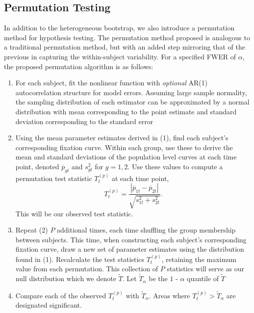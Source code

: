 \documentclass{article}
\begin{document}
\subsection{Permutation Testing}

In addition to the heterogeneous bootstrap, we also introduce a permutation method for hypothesis testing. The permutation method proposed is analogous to a traditional permutation method, but with an added step mirroring that of the previous in capturing the within-subject variability. For a specified FWER of $\alpha$, the proposed permutation algorithm is as follows:

\begin{enumerate}
\vspace{-2mm}
\item For each subject, fit the nonlinear function with \textit{optional} AR(1) autocorrelation structure for model errors. Assuming large sample normality, the sampling distribution of each estimator can be approximated by a normal distribution with mean corresponding to the point estimate and standard deviation corresponding to the standard error
\item Using the mean parameter estimates derived in (1), find each subject's corresponding fixation curve. Within each group, use these to derive the mean and standard deviations of the population level curves at each time point, denoted $\overline{p}_{gt}$ and $s_{gt}^2$ for $g = 1,2$. Use these values to compute a permutation test statistic $T_t^{(p)}$ at each time point,
\begin{equation}
T_t^{(p)} = \frac{|\overline{p}_{1t} - \overline{p}_{2t}|}{\sqrt{s_{1t}^2 + s_{2t}^2}}.
\end{equation}
This will be our observed test statistic.
\item Repeat (2) $P$  additional times, each time shuffling the group membership between subjects. This time, when constructing each subject's corresponding fixation curve, draw a new set of parameter estimates using the distribution found in (1). Recalculate the test statistics $T_t^{(p)}$, retaining the maximum value from each permutation. This collection of $P$ statistics will serve as our null distribution which we denote $\widetilde{T}$. Let $\widetilde{T}_{\alpha}$ be the $1$ - $\alpha$ quantile of $\widetilde{T}$
\item Compare each of the observed $T_t^{(p)}$ with $\widetilde{T}_{\alpha}$. Areas where $T_t^{(p)} > \widetilde{T}_{\alpha}$ are designated significant. 
\end{enumerate}
\end{document}
